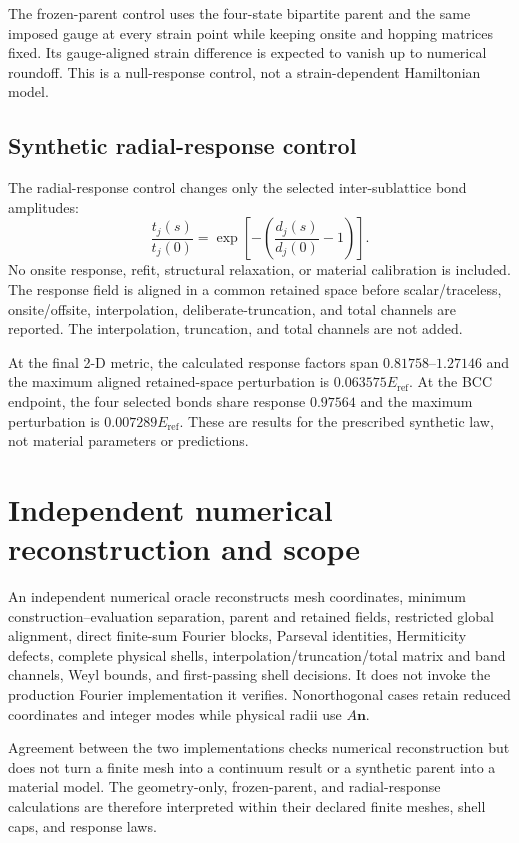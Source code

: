 The frozen-parent control uses the four-state bipartite parent and the
same imposed gauge at every strain point while keeping onsite and hopping matrices fixed.
Its gauge-aligned strain difference is expected to vanish up to numerical roundoff. This
is a null-response control, not a strain-dependent Hamiltonian model.

\subsection{Synthetic radial-response control}

The radial-response control changes only the selected inter-sublattice bond amplitudes:
\begin{equation}
 \frac{t_j(s)}{t_j(0)}=
 \exp\!\left[-\left(\frac{d_j(s)}{d_j(0)}-1\right)\right].
 \label{eq:app-radial-response}
\end{equation}
No onsite response, refit, structural relaxation, or material calibration is included.
The response field is aligned in a common retained space before scalar/traceless,
onsite/offsite, interpolation, deliberate-truncation, and total channels are reported.
The interpolation, truncation, and total channels are not added.

At the final 2-D metric, the calculated response factors span
$0.81758$--$1.27146$ and the maximum aligned retained-space perturbation is
$0.063575E_{\mathrm{ref}}$. At the BCC endpoint, the four selected bonds share response
$0.97564$ and the maximum perturbation is $0.007289E_{\mathrm{ref}}$. These are
results for the prescribed synthetic law, not material parameters or predictions.

\section{Independent numerical reconstruction and scope}
\label{app:verification}

An independent numerical oracle reconstructs mesh coordinates, minimum
construction--evaluation separation, parent and retained fields, restricted global
alignment, direct finite-sum Fourier blocks, Parseval identities, Hermiticity defects,
complete physical shells, interpolation/truncation/total matrix and band channels, Weyl
bounds, and first-passing shell decisions. It does not invoke the production Fourier
implementation it verifies. Nonorthogonal cases retain reduced coordinates and integer
modes while physical radii use $A\mathbf n$.

Agreement between the two implementations checks numerical reconstruction but does not
turn a finite mesh into a continuum result or a synthetic parent into a material model.
The geometry-only, frozen-parent, and radial-response calculations are therefore
interpreted within their declared finite meshes, shell caps, and response laws.
